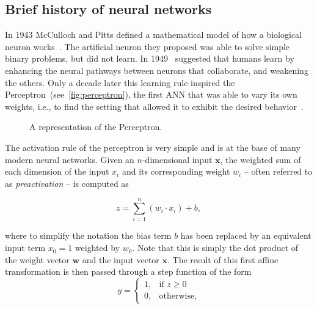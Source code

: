 \subsection{Brief history of neural networks}
In 1943 McCulloch and Pitts defined a mathematical model of how a biological
neuron works~\citep{McCulloch43}. The artificial neuron they proposed was
able to solve simple binary problems, but did not learn. In 1949~\cite{Hebb49}
suggested that humans learn by enhancing the neural pathways between neurons
that collaborate, and weakening the others. Only a decade later this learning
rule inspired the Perceptron~(see~\autoref{fig:perceptron}), the first ANN that
was able to vary its own weights, i.e., to find the setting that allowed it to
exhibit the desired behavior~\citep{Rosenblatt57}.

\begin{figure}[t]
    \centering
    \begin{neuralnetwork} [nodespacing=6mm, layerspacing=23mm,
            maintitleheight=2.5em, layertitleheight=5em,
            height=3, toprow=true, nodesize=17pt,
            style={}, title={}, titlestyle={}]

        \outputlayer[count=1, text=\nodetextsigma]
        {\setdefaultlinklabel{\wilink}\linklayers}
        \redefinelayerspacing{18mm}
        \outputlayer[count=1, text=\nodetextstep]
        \linklayers
        \redefinelayerspacing{16mm}
        \outputlayer[count=1, text=\nodetexty]
        \linklayers
    \end{neuralnetwork}
    \centering
    \caption{\label{fig:perceptron}A representation of the Perceptron.}
\end{figure}

The activation rule of the perceptron is very simple and is at the base of many
modern neural networks. Given an $n$-dimensional input $\mathbf{x}$, the
weighted sum of each dimension of the input $x_i$ and its corresponding weight
$w_i$ -- often referred to as \emph{preactivation} -- is computed as

\begin{equation*}
    z = \sum_{i=1}^{n}(w_i \cdot x_i) + b,
\end{equation*}

\noindent where to simplify the notation the bias term $b$ has been replaced
by an equivalent input term $x_0=1$ weighted by $w_0$. Note that this is simply
the dot product of the weight vector $\mathbf{w}$ and the input vector
$\mathbf{x}$. The result of this first affine transformation is then passed
through a step function of the form
\begin{equation*}
    y =
        \begin{cases}
            1,          & \text{if } z \geq 0 \\
            0,         & \text{otherwise},
        \end{cases}
\end{equation*}

